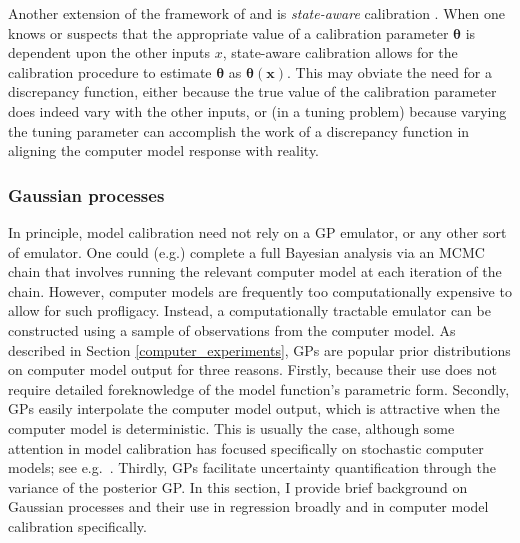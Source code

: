 \documentclass{article}
\begin{document}
Another extension of the framework of \cite{Kennedy2001} and \cite{Bayarri2007} is \emph{state-aware} calibration \citep{Atamturktur2015,Stevens2018,Brown2016}. When one knows or suspects that the appropriate value of a calibration parameter $\boldsymbol \theta$ is dependent upon the other inputs $x$, state-aware calibration allows for the calibration procedure to estimate $\boldsymbol \theta$ as $\boldsymbol \theta(\mathbf x)$. This may obviate the need for a discrepancy function, either because the true value of the calibration parameter does indeed vary with the other inputs, or (in a tuning problem) because varying the tuning parameter can accomplish the work of a discrepancy function in aligning the computer model response with reality.

\subsubsection{Gaussian processes} \label{gaussian_processes}

In principle, model calibration%
need not rely on a GP emulator, or any other sort of emulator. One could (e.g.) complete a full Bayesian analysis via an MCMC chain that involves running the relevant computer model at each iteration of the chain. However, computer models are frequently too computationally expensive to allow for such profligacy. Instead, a computationally tractable emulator can be constructed using a sample of observations from the computer model. As described in Section \ref{computer_experiments}, GPs are popular prior distributions on computer model output for three reasons. Firstly, because their use does not require detailed foreknowledge of the model function's parametric form. Secondly, GPs easily interpolate the computer model output, which is attractive when the computer model is deterministic. This is usually the case, although some attention in model calibration has focused specifically on stochastic computer models; see e.g.\ \cite{Pratola2018}. Thirdly, GPs facilitate uncertainty quantification through the variance of the posterior GP. In this section, I provide brief background on Gaussian processes and their use in regression broadly and in computer model calibration specifically.

\end{document}
